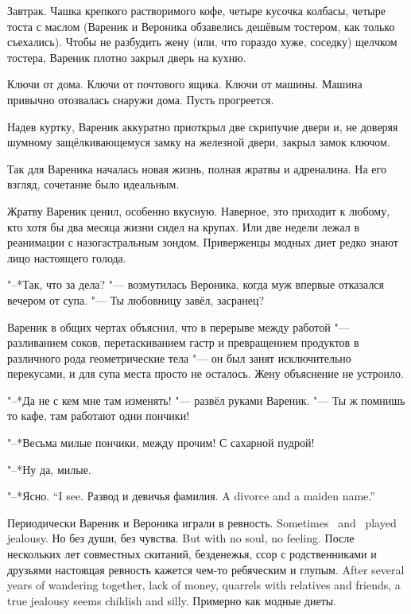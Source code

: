 Завтрак.
Чашка крепкого растворимого кофе, четыре кусочка колбасы, четыре тоста с маслом (Вареник и Вероника обзавелись дешёвым тостером, как только съехались).
Чтобы не разбудить жену (или, что гораздо хуже, соседку) щелчком тостера, Вареник плотно закрыл дверь на кухню.

Ключи от дома.
Ключи от почтового ящика.
Ключи от машины.
Машина привычно отозвалась снаружи дома.
Пусть прогреется.

Надев куртку, Вареник аккуратно приоткрыл две скрипучие двери и, не доверяя шумному защёлкивающемуся замку на железной двери, закрыл замок ключом.

\asterism

Так для Вареника началась новая жизнь, полная жратвы и адреналина.
На его взгляд, сочетание было идеальным.

Жратву Вареник ценил, особенно вкусную.
Наверное, это приходит к любому, кто хотя бы два месяца жизни сидел на крупах.
Или две недели лежал в реанимации с назогастральным зондом.
Приверженцы модных диет редко знают лицо настоящего голода.

"--*Так, что за дела? "--- возмутилась Вероника, когда муж впервые отказался вечером от супа.
"--- Ты любовницу завёл, засранец?

Вареник в общих чертах объяснил, что в перерыве между работой "--- разливанием соков, перетаскиванием гастр и превращением продуктов в различного рода геометрические тела "--- он был занят исключительно перекусами, и для супа места просто не осталось.
Жену объяснение не устроило.

"--*Да не с кем мне там изменять! "--- развёл руками Вареник.
"--- Ты ж помнишь то кафе, там работают одни пончики!

"--*Весьма милые пончики, между прочим!
С сахарной пудрой!

"--*Ну да, милые.

{"--*Ясно.}
{``I see.}
{Развод и девичья фамилия.}
{A divorce and a maiden name.''}

{Периодически Вареник и Вероника играли в ревность.}
{Sometimes \Varenik\ and \Veronika\ played jealousy.}
{Но без души, без чувства.}
{But with no soul, no feeling.}
{После нескольких лет совместных скитаний, безденежья, ссор с родственниками и друзьями настоящая ревность кажется чем-то ребяческим и глупым.}
{After several years of wandering together, lack of money, quarrels with relatives and friends, a true jealousy seems childish and silly.}
Примерно как модные диеты.


